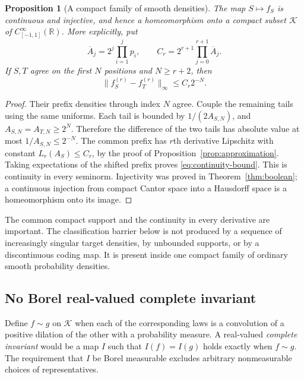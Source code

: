 \documentclass[11pt,a4paper]{article}
\newtheorem{proposition}[theorem]{Proposition}
\theoremstyle{definition}
\theoremstyle{remark}
\newcommand{\R}{\mathbb R}
\begin{document}
\begin{proposition}[A compact family of smooth densities]\label{prop:continuous}
The map $S\mapsto f_S$ is continuous and injective, and hence a
homeomorphism onto a compact subset $\mathcal K$ of
$C^\infty_{[-1,1]}(\R)$. More explicitly, put
\[
 \overline A_j=2^j\prod_{i=1}^jp_i,\qquad
 C_r=2^{r+1}\prod_{j=0}^{r+1}\overline A_j.
\]
If $S,T$ agree on the first $N$ positions and $N\ge r+2$, then
\begin{equation}\label{eq:continuity-bound}
 \|f_S^{(r)}-f_T^{(r)}\|_\infty\le C_r2^{-N}.
\end{equation}
\end{proposition}
\begin{proof}
Their prefix densities through index $N$ agree. Couple the remaining tails
using the same uniforms. Each tail is bounded by $1/(2A_{S,N})$, and
$A_{S,N}=A_{T,N}\ge2^N$. Therefore the difference of the two tails has
absolute value at most $1/A_{S,N}\le2^{-N}$.
The common prefix has $r$th derivative Lipschitz with constant
$L_r(A_S)\le C_r$, by the proof of
Proposition~\ref{prop:approximation}. Taking expectations of the shifted
prefix proves \eqref{eq:continuity-bound}. This is continuity in every
seminorm. Injectivity was proved in Theorem~\ref{thm:boolean}; a continuous
injection from compact Cantor space into a Hausdorff space is a
homeomorphism onto its image.
\end{proof}

The common compact support and the continuity in every derivative are
important. The classification barrier below is not produced by a sequence
of increasingly singular target densities, by unbounded supports, or by
a discontinuous coding map. It is present inside one compact family of
ordinary smooth probability densities.

\subsection{No Borel real-valued complete invariant}
Define $f\sim g$ on $\mathcal K$ when each of the corresponding laws is a
convolution of a positive dilation of the other with a probability measure.
A real-valued \emph{complete invariant} would be a map $I$ such that
$I(f)=I(g)$ holds exactly when $f\sim g$. The requirement that $I$ be
Borel measurable excludes arbitrary nonmeasurable choices of representatives.
\end{document}
